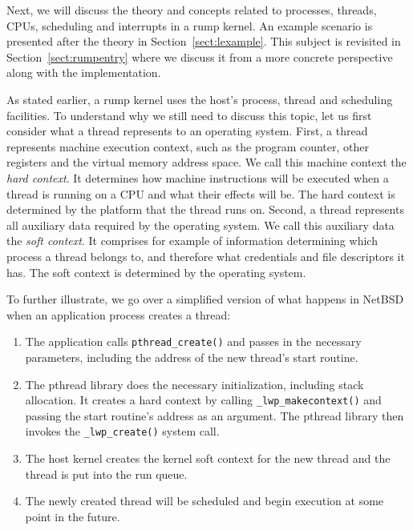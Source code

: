 Next, we will discuss the theory and concepts related to processes,
threads, CPUs, scheduling and interrupts in a rump kernel.  An
example scenario is presented after the theory in
Section~\ref{sect:lexample}.  This subject is revisited in
Section~\ref{sect:rumpentry} where we discuss it from a more concrete
perspective along with the implementation.

As stated earlier, a rump kernel uses the host's process, thread and
scheduling facilities.  To understand why we still need to discuss
this topic, let us first consider what a thread represents to an
operating system.  First, a thread represents machine execution context,
such as the program counter, other registers and the virtual memory
address space.  We call this machine context the \textit{hard context}.
It determines how machine instructions will be executed when a thread
is running on a CPU and what their effects will be.  The hard context
is determined by the platform that the thread runs on.  Second, a
thread represents all auxiliary data required by the operating system.
We call this auxiliary data the \textit{soft context}.  It comprises
for example of information determining which process a thread belongs
to, and \eg therefore what credentials and file descriptors it has.
The soft context is determined by the operating system.

To further illustrate, we go over a simplified version of what happens
in NetBSD when an application process creates a thread:

\begin{enumerate}
\item   The application calls \verb+pthread_create()+ and passes
	in the necessary parameters, including the address of the new
	thread's start routine.

\item   The pthread library does the necessary initialization, including
	stack allocation.  It creates a hard context
	by calling \verb+_lwp_makecontext()+ and passing the
	start routine's address as an argument.  The pthread library then
	invokes the \verb+_lwp_create()+ system call.

\item   The host kernel creates the kernel soft context for the
	new thread and the thread is put into the run queue.

\item	The newly created thread will be scheduled and begin execution
	at some point in the future.
\end{enumerate}

